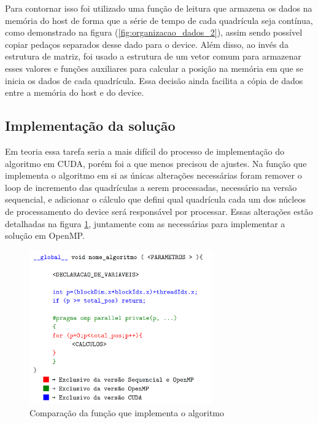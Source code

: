 Para contornar isso foi utilizado uma função de leitura que armazena os dados na memória do host de forma que a série de tempo de cada quadrícula seja contínua, como demonstrado na figura (\ref{fig:organizacao_dados_2}), assim sendo possível copiar pedaços separados desse dado para o device. Além disso, ao invés da estrutura de matriz, foi usado a estrutura de um vetor comum para armazenar esses valores e funções auxiliares para calcular a posição na memória em que se inicia os dados de cada quadrícula. Essa decisão ainda facilita a cópia de dados entre a memória do host e do device.

\subsection{Implementação da solução}\label{cap:implementacao_solucao}

Em teoria essa tarefa seria a mais difícil do processo de implementação do algoritmo em CUDA, porém foi a que menos precisou de ajustes. Na função que implementa o algoritmo em si as únicas alterações necessárias foram remover o loop de incremento das quadrículas a serem processadas, necessário na versão sequencial, e adicionar o cálculo que defini qual quadrícula cada um dos núcleos de processamento do device será responsável por processar. Essas alterações estão detalhadas na figura \ref{fig:comparacao_codigo_padrao}, juntamente com as necessárias para implementar a solução em OpenMP.

\begin{figure}[H]
\centering
\includegraphics[width=0.7\textwidth]{Imagens/comparacao_codigo/comparacao_codigo_padrao.png}
\caption{Comparação da função que implementa o algoritmo}
\label{fig:comparacao_codigo_padrao}
\end{figure}

